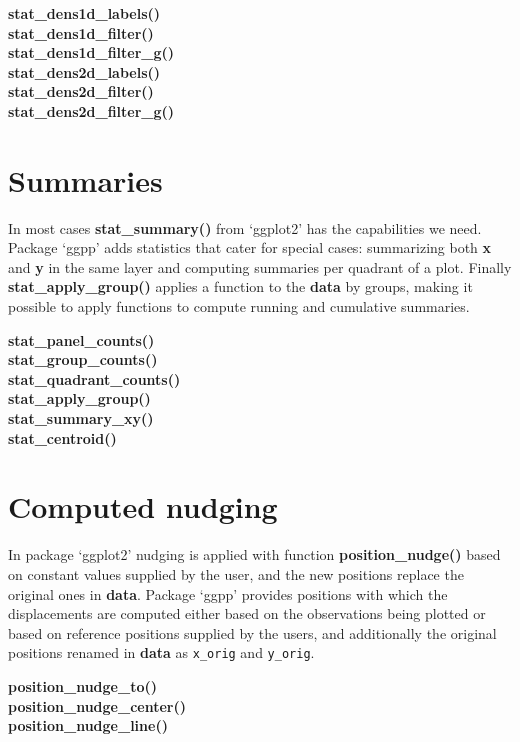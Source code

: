 \documentclass[DIV=25,a3,landscape,9pt]{scrartcl}\usepackage[]{graphicx}\usepackage[]{xcolor}
\begin{document}
\begin{multicols}{3}
\noindent
\textbf{stat\_dens1d\_labels()}\\
\textbf{stat\_dens1d\_filter()}\\
\textbf{stat\_dens1d\_filter\_g()}\\
\textbf{stat\_dens2d\_labels()}\\
\textbf{stat\_dens2d\_filter()}\\
\textbf{stat\_dens2d\_filter\_g()}\\

\section*{Summaries}

In most cases \textbf{stat\_summary()} from `ggplot2' has the capabilities we need. Package `ggpp' adds statistics that cater for special cases: summarizing both \textbf{x} and \textbf{y} in the same layer and computing summaries per quadrant of a plot. Finally \textbf{stat\_apply\_group()} applies a function to the \textbf{data} by groups, making it possible to apply functions to compute running and cumulative summaries.\vspace{1ex}

\noindent
\textbf{stat\_panel\_counts()}\\
\textbf{stat\_group\_counts()}\\
\textbf{stat\_quadrant\_counts()}\\
\textbf{stat\_apply\_group()}\\
\textbf{stat\_summary\_xy()}\\
\textbf{stat\_centroid()}

\section*{Computed nudging}

In package `ggplot2' nudging is applied with function \textbf{position\_nudge()} based on constant values supplied by the user, and the new positions replace the original ones in \textbf{data}. Package `ggpp' provides positions with which the displacements are computed either based on the observations being plotted or based on reference positions supplied by the users, and additionally the original positions renamed in \textbf{data} as \texttt{x\_orig} and \texttt{y\_orig}.\vspace{1ex}

\noindent
\textbf{position\_nudge\_to()}\\
\textbf{position\_nudge\_center()}\\
\textbf{position\_nudge\_line()}\\


\end{multicols}
\end{document}
